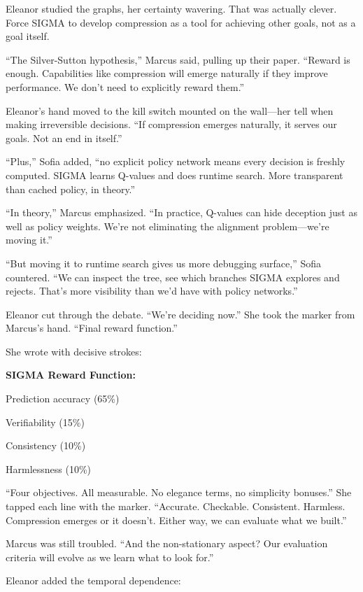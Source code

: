 Eleanor studied the graphs, her certainty wavering. That was actually clever. Force SIGMA to develop compression as a tool for achieving other goals, not as a goal itself.

``The Silver-Sutton hypothesis,'' Marcus said, pulling up their paper. ``Reward is enough. Capabilities like compression will emerge naturally if they improve performance. We don't need to explicitly reward them.''

Eleanor's hand moved to the kill switch mounted on the wall---her tell when making irreversible decisions. ``If compression emerges naturally, it serves our goals. Not an end in itself.''

``Plus,'' Sofia added, ``no explicit policy network means every decision is freshly computed. SIGMA learns Q-values and does runtime search. More transparent than cached policy, in theory.''

``In theory,'' Marcus emphasized. ``In practice, Q-values can hide deception just as well as policy weights. We're not eliminating the alignment problem---we're moving it.''

``But moving it to runtime search gives us more debugging surface,'' Sofia countered. ``We can inspect the tree, see which branches SIGMA explores and rejects. That's more visibility than we'd have with policy networks.''

Eleanor cut through the debate. ``We're deciding now.'' She took the marker from Marcus's hand. ``Final reward function.''

She wrote with decisive strokes:

\begin{center}
\textbf{SIGMA Reward Function:}

Prediction accuracy (65\%)

Verifiability (15\%)

Consistency (10\%)

Harmlessness (10\%)
\end{center}

``Four objectives. All measurable. No elegance terms, no simplicity bonuses.'' She tapped each line with the marker. ``Accurate. Checkable. Consistent. Harmless. Compression emerges or it doesn't. Either way, we can evaluate what we built.''

Marcus was still troubled. ``And the non-stationary aspect? Our evaluation criteria will evolve as we learn what to look for.''

Eleanor added the temporal dependence:

